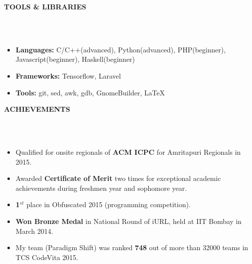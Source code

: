 \documentclass[a4paper,10pt]{article}
\newcommand{\lsep}{-0.5cm}
\newcommand{\resheading}[1]{{\small \colorbox{mygrey}{\begin{minipage}{0.975\textwidth}{\textbf{#1 \vphantom{p\^{E}}}}\end{minipage} \hspace{0.2cm}}}}
\begin{document}
\resheading{\textbf{TOOLS \& LIBRARIES}}\\[\lsep]
\\
\begin{itemize}
 \item \textbf{Languages: } C/C++(advanced), Python(advanced), PHP(beginner), Javascript(beginner), Haskell(beginner)
 \item \textbf{Frameworks: } Tensorflow, Laravel
 \item \textbf{Tools: } git, sed, awk, gdb, GnomeBuilder, \LaTeX
 
\end{itemize}

\resheading{\textbf{ACHIEVEMENTS}}\\[\lsep]
\\
\begin{itemize}
 \item Qualified for onsite regionals of \textbf{ACM ICPC} for Amritapuri Regionals in 2015.
 \item Awarded \textbf{Certificate of Merit} two times for exceptional academic achievements during freshmen year and sophomore year.
 \item \textbf{1}$^{st}$ place in Obfuscated 2015 (programming competition).
 \item \textbf{Won Bronze Medal} in National Round of iURL, held at IIT Bombay in March 2014.
 \item My team (Paradigm Shift) was ranked \textbf{748} out of more than 32000 teams in TCS CodeVita 2015.
 
\end{itemize}
\end{document}
